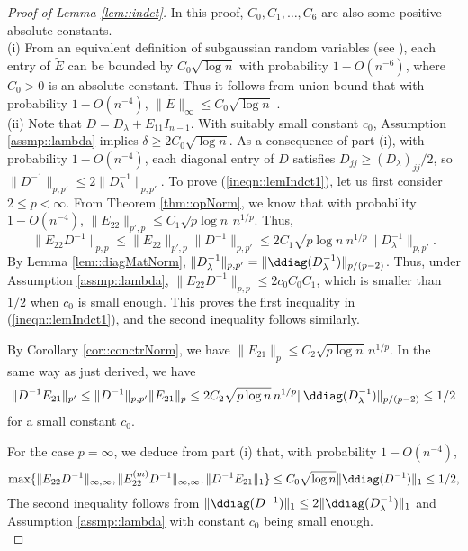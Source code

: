 \documentclass[12pt]{article}%
\theoremstyle{plain}%
\theoremstyle{remark}
\begin{document}
\begin{proof}[Proof of Lemma \ref{lem::indct}]
In this proof, $C_0,C_1,\ldots, C_6$ are also some positive absolute constants.\\
(i) From an equivalent definition of subgaussian random variables (see \citep{Ver10}), each entry of $\tilde{E}$ can be bounded by $C_0\sqrt{\log n}$ with probability $1- O(n^{-6})$, where $C_0>0$ is an absolute constant. Thus it follows from union bound that with probability $1 - O(n^{-4})$, $\| \tilde{E} \|_{\infty} \le C_0 \sqrt{\log n}$ .\\

(ii) Note that $D = D_\lambda + E_{11}I_{n-1}$. With suitably small constant $c_0$, Assumption \ref{assmp::lambda} implies $\delta \ge 2C_0  \sqrt{\log n}$. As a consequence of part (i), with probability $1 - O(n^{-4})$, each diagonal entry of $D$ satisfies $D_{jj} \ge (D_\lambda)_{jj}/2$, so $\| D^{-1} \|_{p,p'} \le 2 \| D_\lambda^{-1} \|_{p,p'}$. To prove (\ref{ineqn::lemIndct1}), let us first consider $2 \le p < \infty$. From Theorem \ref{thm::opNorm}, we know that with probability $1 - O(n^{-4})$, $\| E_{22} \|_{p',p} \le C_1\sqrt{p \log n}\, n^{1/p}$. Thus,
\begin{equation*}
\| E_{22} D^{-1} \|_{p,p} \le \| E_{22} \|_{p',p} \| D^{-1} \|_{p,p'} \le 2C_1\sqrt{p \log n}\, n^{1/p}\| D_\lambda^{-1} \|_{p,p'} . 
\end{equation*}
By Lemma \ref{lem::diagMatNorm}, $\| D_\lambda^{-1} \|_{p,p'} = \| \ddiag(D_\lambda^{-1}) \|_{p/(p-2)}$. Thus, under Assumption \ref{assmp::lambda}, $\| E_{22} D^{-1} \|_{p,p} \le 2c_0C_0C_1$, which is smaller than $1/2$ when $c_0$ is small enough. This proves the first inequality in (\ref{ineqn::lemIndct1}), and the second inequality follows similarly.
 
By Corollary \ref{cor::conctrNorm}, we have $\| E_{21} \|_p \le C_2 \sqrt{p \log n}\, n^{1/p}$. In the same way as just derived, we have
\begin{equation*}
\| D^{-1}E_{21} \|_{p'} \le \| D^{-1} \|_{p,p'} \| E_{21} \|_{p} \le 2C_2\sqrt{p \log n}\, n^{1/p} \| \ddiag(D_\lambda^{-1}) \|_{p/(p-2)} \le 1/2
\end{equation*}
for a small constant $c_0$. 

For the case $p = \infty$, we deduce from part (i) that, with probability $1 - O(n^{-4})$,
\begin{equation} \label{ineqn::E22InfNorm}
\max\{\| E_{22} D^{-1} \|_{\infty, \infty},  \| E_{22}^{(m)} D^{-1} \|_{\infty, \infty}, \| D^{-1} E_{21} \|_1\} \le C_0 \sqrt{\log n} \| \ddiag(D^{-1}) \|_{1} \le 1/2,
\end{equation}
The second inequality follows from $ \| \ddiag(D^{-1}) \|_{1} \le 2 \| \ddiag(D_\lambda^{-1}) \|_{1}$ and Assumption \ref{assmp::lambda} with constant $c_0$ being small enough.\\


\end{proof}
\end{document}

